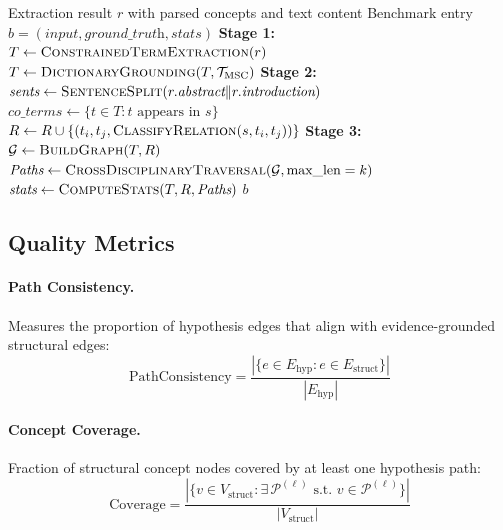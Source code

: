 \begin{algorithm}[t]
\caption{Evidence-Grounded Benchmark GT Construction}
\label{alg:gt_construction}
\begin{algorithmic}[1]
\REQUIRE Extraction result $r$ with parsed concepts and text content
\ENSURE Benchmark entry $b = (\textit{input}, \textit{ground\_truth}, \textit{stats})$
\STATE \textbf{Stage 1:} $T \leftarrow \textsc{ConstrainedTermExtraction}(r)$
\STATE $T \leftarrow \textsc{DictionaryGrounding}(T, \mathcal{T}_{\text{MSC}})$
\STATE \textbf{Stage 2:} $\textit{sents} \leftarrow \textsc{SentenceSplit}(r.\textit{abstract} \| r.\textit{introduction})$
    \STATE $\textit{co\_terms} \leftarrow \{t \in T : t \text{ appears in } s\}$
        \STATE $R \leftarrow R \cup \{(t_i, t_j, \textsc{ClassifyRelation}(s, t_i, t_j))\}$
    \ENDFOR
\ENDFOR
\STATE \textbf{Stage 3:} $\mathcal{G} \leftarrow \textsc{BuildGraph}(T, R)$ 
\STATE $\textit{Paths} \leftarrow \textsc{CrossDisciplinaryTraversal}(\mathcal{G}, \text{max\_len}=k)$
\STATE $\textit{stats} \leftarrow \textsc{ComputeStats}(T, R, \textit{Paths})$
\RETURN $b$
\end{algorithmic}
\end{algorithm}



\subsection{Quality Metrics}

\paragraph{Path Consistency.}
Measures the proportion of hypothesis edges that align with evidence-grounded structural edges:
\begin{equation}
    \text{PathConsistency} = \frac{|\{e \in E_{\text{hyp}} : e \in E_{\text{struct}}\}|}{|E_{\text{hyp}}|}
\end{equation}

\paragraph{Concept Coverage.}
Fraction of structural concept nodes covered by at least one hypothesis path:
\begin{equation}
    \text{Coverage} = \frac{|\{v \in V_{\text{struct}} : \exists\, \mathcal{P}^{(\ell)} \text{ s.t. } v \in \mathcal{P}^{(\ell)}\}|}{|V_{\text{struct}}|}
\end{equation}

